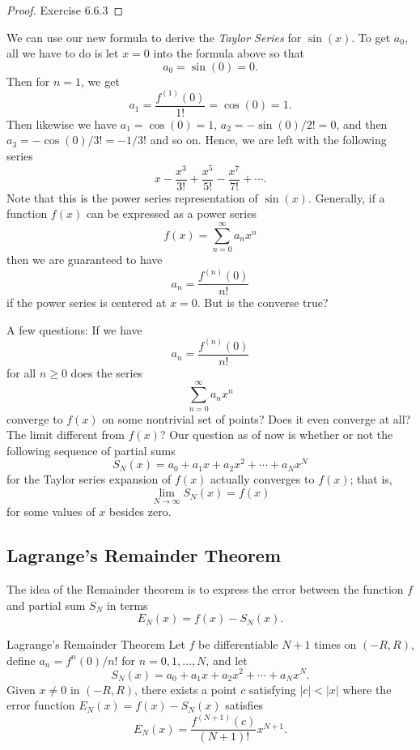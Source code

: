 \begin{proof}
Exercise 6.6.3
\end{proof}

We can use our new formula to derive the \textit{Taylor Series} for \( \sin(x)  \). To get \( a_{0} \), all we have to do is let \( x = 0  \) into the formula above so that 
\[  a_{0} = \sin(0) = 0. \] Then for \( n =1  \), we get 
\[  a_{1} = \frac{ f^{(1)}(0) }{ 1! } = \cos(0) = 1.  \]
Then likewise we have \( a_{1} = \cos(0) = 1  \), \( a_{2} = - \sin(0) / 2! = 0  \), and then \( a_{3} = - \cos(0) / 3! = -1/ 3! \) and so on. Hence, we are left with the following series
\[  x - \frac{ x^{3} }{ 3! }  + \frac{ x^{5} }{ 5! }  - \frac{ x^{7} }{ 7! }  + \dotsb .  \]
Note that this is the power series representation of \( \sin(x)  \). Generally, if a function \( f(x)  \) can be expressed as a power series
\[  f(x) = \sum_{ n=0 }^{ \infty  } a_{n} x^{n} \] then we are guaranteed to have 
\[  a_n = \frac{ f^{(n)}(0) }{ n! } \]
if the power series is centered at \( x = 0  \). But is the converse true? 

A few questions: 
     If we have 
        \[  a_n = \frac{ f^{(n)}(0) }{ n! }  \] for all \( n \geq 0  \) does the series
        \[  \sum_{ n=0 }^{ \infty  } a_n x^{n} \] converge to \( f(x)  \) on some nontrivial set of points?  Does it even converge at all? The limit different from \( f(x)  \)? Our question as of now is whether or not the following sequence of partial sums
        \[  S_{N}(x) = a_{0} + a_{1} x  + a_{2} x^{2} + \dotsb + a_{N} x^{N }  \] for the Taylor series expansion of \( f(x)  \) actually converges to \( f(x)  \); that is, 
        \[ \lim_{ N \to \infty  }  S_{N}(x) = f(x) \]
        for some values of \( x  \) besides zero.

    \subsection{Lagrange's Remainder Theorem}

The idea of the Remainder theorem is to express the error between the function \( f  \) and partial sum \( S_N  \) in terms 
\[  E_N (x) = f(x) - S_N(x).\]

\begin{theorem}{Lagrange's Remainder Theorem}
    Let \( f  \) be differentiable \( N + 1  \) times on \( (-R ,R ) \), define \( a_n = f^{n}(0) / n!  \) for \( n = 0, 1 , \dots , N  \), and let 
    \[  S_N(x) = a_0 + a_{1} x + a_{2}x^{2} + \dotsb + a_{N}x^{N}. \]
    Given \( x \neq 0  \) in \( (-R ,R ) \), there exists a point \( c  \) satisfying \( | c  |  < | x  |  \) where the error function \( E_N(x) = f(x) - S_N(x)  \) satisfies 
    \[  E_N(x) = \frac{ f^{(N+1)}(c) }{ (N+1)!  } x^{N+1}. \]
    \end{theorem}

